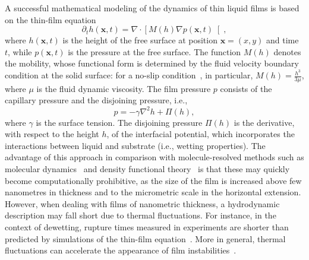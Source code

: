 A successful mathematical modeling of the dynamics of thin liquid films is based on the thin-film equation~\cite{reynoldsIIIExperimentalInvestigation1883, oronLongscaleEvolutionThin1997}
\begin{equation}\label{eq:thin_film}
    \partial_t h(\mathbf{x},t) = \nabla\cdot\left[M(h)\nabla p(\mathbf{x},t)\right[,
\end{equation}
where $h(\mathbf{x},t)$ is the height of the free surface at position $\mathbf{x} = (x,y)$ and time $t$, while $p(\mathbf{x},t)$ is the pressure at the free surface.
The function $M(h)$ denotes the mobility, whose functional form is determined by the fluid velocity boundary condition at the solid surface: for a no-slip condition~\cite{oronLongscaleEvolutionThin1997}, in particular, $M(h)=\frac{h^3}{3\mu}$, where $\mu$ is the fluid dynamic viscosity.
The film pressure $p$ consists of the capillary pressure and the disjoining pressure, i.e.,
\begin{equation}\label{eq:pressure}
    p = - \gamma\nabla^2 h + \Pi(h),
\end{equation}
where $\gamma$ is the surface tension. 
The disjoining pressure $\Pi(h)$ is the derivative, with respect to the height $h$, of the interfacial potential, which incorporates the interactions between liquid and substrate (i.e., wetting properties).
The advantage of this approach in comparison with molecule-resolved methods such as molecular dynamics~\cite{haileMolecularDynamicsSimulation1997, zhangMolecularSimulationThin2019, wengMolecularDynamicsInvestigation2000, grabowThinFilmGrowth1988}
and density functional theory~\cite{vanswolWettingDryingTransitions1989, tarazonaSimpleDensityFunctional1984, meisterDensityfunctionalTheoryInhomogeneous1985, hughesIntroductionInhomogeneousLiquids2014} is that these may quickly become computationally prohibitive, as the size of the film is increased above few nanometres in thickness and to the micrometric scale in the horizontal extension.
However, when dealing with films of nanometric thickness, a hydrodynamic description may fall short due to thermal fluctuations. 
For instance, in the context of dewetting, rupture times measured in experiments are shorter than predicted by simulations of the thin-film equation~\cite{bischofDewettingModesThin1996,herminghausSpinodalDewettingLiquid1998,beckerComplexDewettingScenarios2003}.
More in general, thermal fluctuations can accelerate the appearance of film instabilities~\cite{rauscherWettingPhenomenaNanofluidics2008,tsekovEffectThermalFluctuations1993, fetzerThermalNoiseInfluences2007, zhangMolecularSimulationThin2019}.
